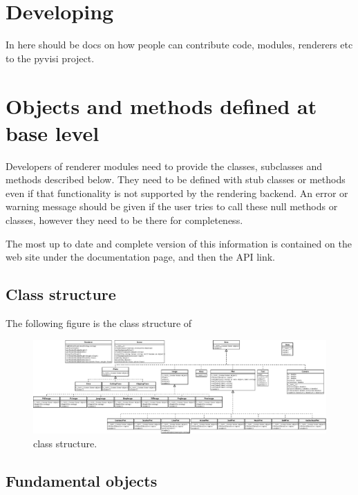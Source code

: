 
\chapter{Developing \pyvisi}
\label{chap:developingPyvisi}

In here should be docs on how people can contribute code, modules, renderers
etc to the pyvisi project.

\chapter{Objects and methods defined at base level}

Developers of \pyvisi renderer modules need to provide the classes, subclasses
and methods described below.  They need to be defined with stub classes or
methods even if that functionality is not supported by the rendering backend.
An error or warning message should be given if the user tries to call these
null methods or classes, however they need to be there for completeness.

The most up to date and complete version of this information is contained on
the \pyvisi web site under the documentation page, and then the API link.

\section{Class structure}

The following figure is the class structure of \pyvisi

\begin{figure}
\centerline{%
\includegraphics[width=\textheight,angle=90]{figures/pyvisi_class_structure}%
}
\caption{\pyvisi class structure.}
\end{figure}

\section{Fundamental objects}

